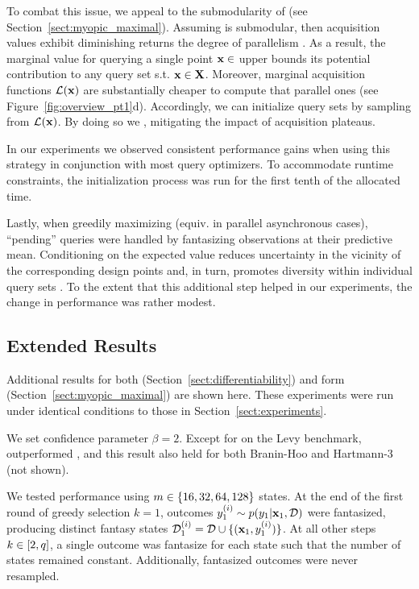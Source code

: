 To combat this issue, we appeal to the submodularity of \Acq{} (see Section~\ref{sect:myopic_maximal}). Assuming \Acq{} is submodular, then acquisition values exhibit diminishing returns \wrt{} the degree of parallelism \parallelism{}. As a result, the marginal value for querying a single point \(\mathbf{x} \in \) upper bounds its potential contribution to any query set \X{} s.t. \(\mathbf{x} \in \mathbf{X}\). Moreover, marginal acquisition functions \(\mathcal{L}(\mathbf{x})\) are substantially cheaper to compute that parallel ones (see Figure~\ref{fig:overview_pt1}d). Accordingly, we can initialize query sets \X{} by sampling from \(\mathcal{L}(\mathbf{x})\). By doing so we , mitigating the impact of acquisition plateaus.

In our experiments we observed consistent performance gains when using this strategy in conjunction with most query optimizers. To accommodate runtime constraints, the initialization process was run for the first tenth of the allocated time.

Lastly, when greedily maximizing \Acq{} (equiv. in parallel asynchronous cases), ``pending'' queries were handled by fantasizing observations at their predictive mean. Conditioning on the expected value reduces uncertainty in the vicinity of the corresponding design points and, in turn, promotes diversity within individual query sets \cite{desautels2014parallelizing}. To the extent that this additional step helped in our experiments, the change in performance was rather modest.


\subsection{Extended Results}
\label{appendix:results_extended}

Additional results for both \qUCB{} (Section~\ref{sect:differentiability}) and \mmform{} form \qEI{} (Section~\ref{sect:myopic_maximal}) are shown here. These experiments were run under identical conditions to those in Section~\ref{sect:experiments}. 

 We set confidence parameter \(\beta = 2\). Except for on the Levy benchmark, \qUCB{} outperformed \qEI{}, and this result also held for both Branin-Hoo and Hartmann-3 (not shown).


 We tested performance using \(m \in \{16, 32, 64, 128\}\) states. At the end of the first round of greedy selection \(k=1\), \nSamples{} outcomes \(y^{(i)}_{1} \sim p(y_{1} | \mathbf{x}_{1}, \mathcal{D})\) were fantasized, producing \nSamples{} distinct fantasy states \(\mathcal{D}^{(i)}_{1} = \mathcal{D} \cup \{(\mathbf{x}_{1}, y^{(i)}_{1})\}\). At all other steps \(k \in [2,q]\), a single outcome was fantasize for each state such that the number of states remained constant. Additionally, fantasized outcomes were never resampled.

